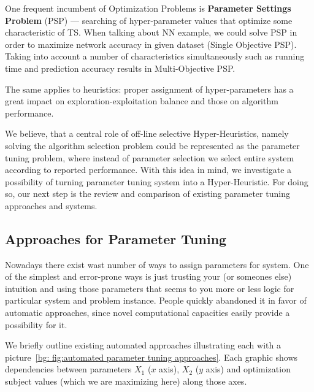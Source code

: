One frequent incumbent of Optimization Problems is \textbf{Parameter Settings Problem} (PSP) — searching of hyper-parameter values that optimize some characteristic of TS. When talking about NN example, we could solve PSP in order to maximize network accuracy in given dataset (Single Objective PSP). Taking into account a number of characteristics simultaneously such as running time and prediction accuracy results in Multi-Objective PSP.

The same applies to heuristics: proper assignment of hyper-parameters has a great impact on exploration-exploitation balance and those on algorithm performance.

We believe, that a central role of off-line selective Hyper-Heuristics, namely solving the algorithm selection problem could be represented as the parameter tuning problem, where instead of parameter selection we select entire system according to reported performance. With this idea in mind, we investigate a possibility of turning parameter tuning system into a Hyper-Heuristic.
For doing so, our next step is the review and comparison of existing parameter tuning approaches and systems. 


\subsection{Approaches for Parameter Tuning}
Nowadays there exist wast number of ways to assign parameters for system. 
One of the simplest and error-prone ways is just trusting your (or someones else) intuition and using those parameters that seems to you more or less logic for particular system and problem instance. People quickly abandoned it in favor of automatic approaches, since novel computational capacities easily provide a possibility for it.

We briefly outline existing automated approaches illustrating each with a picture~\ref{bg: fig:automated parameter tuning approaches}. Each graphic shows dependencies between parameters $X_1$ ($x$ axis), $X_2$ ($y$ axis) and optimization subject values (which we are maximizing here) along those axes.

